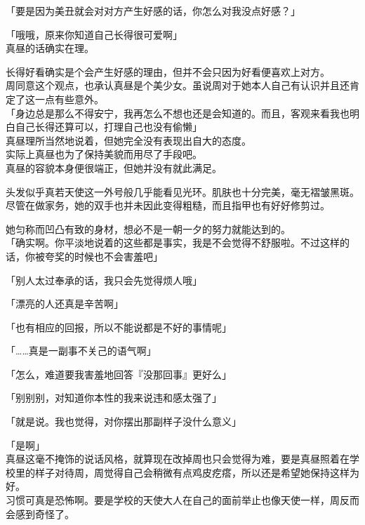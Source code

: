 「要是因为美丑就会对对方产生好感的话，你怎么对我没点好感？」

「哦哦，原来你知道自己长得很可爱啊」\\

真昼的话确实在理。

长得好看确实是个会产生好感的理由，但并不会只因为好看便喜欢上对方。\\

周同意这个观点，也承认真昼是个美少女。虽说周对于她本人自己有认识并且还肯定了这一点有些意外。\\

「身边总是那么不得安宁，我再怎么不想也还是会知道的。而且，客观来看我也明白自己长得还算可以，打理自己也没有偷懒」\\

真昼理所当然地说着，但她完全没有表现出自大的态度。\\

实际上真昼也为了保持美貌而用尽了手段吧。\\

真昼的容貌本身便很端正，但她并没有就此满足。

头发似乎真若天使这一外号般几乎能看见光环。肌肤也十分完美，毫无褶皱黑斑。尽管在做家务，她的双手也并未因此变得粗糙，而且指甲也有好好修剪过。

她匀称而凹凸有致的身材，想必不是一朝一夕的努力就能达到的。\\

「确实啊。你平淡地说着的这些都是事实，我是不会觉得不舒服啦。不过这样的话，你被夸奖的时候也不会害羞吧」

「别人太过奉承的话，我只会先觉得烦人哦」

「漂亮的人还真是辛苦啊」

「也有相应的回报，所以不能说都是不好的事情呢」

「……真是一副事不关己的语气啊」

「怎么，难道要我害羞地回答『没那回事』更好么」

「别别别，对知道你本性的我来说违和感太强了」

「就是说。我也觉得，对你摆出那副样子没什么意义」

「是啊」\\

真昼这毫不掩饰的说话风格，就算现在改掉周也只会觉得为难，要是真昼照着在学校里的样子对待周，周觉得自己会稍微有点鸡皮疙瘩，所以还是希望她保持这样为好。\\

习惯可真是恐怖啊。要是学校的天使大人在自己的面前举止也像天使一样，周反而会感到奇怪了。


